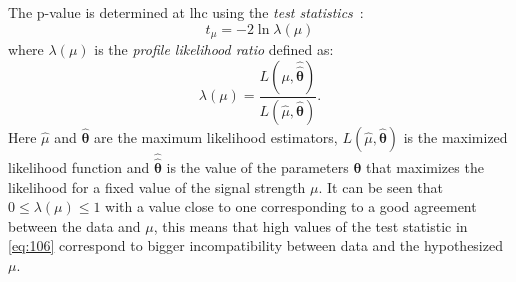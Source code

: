 The p-value is determined at \gls{lhc} using the \emph{test
  statistics}~\cite{StatProcedure}:
\begin{equation}
  \label{eq:106}
  t_\mu = - 2 \ln \lambda(\mu)
\end{equation}
where $\lambda(\mu)$ is the \emph{profile likelihood ratio} defined as:
\begin{equation}
  \label{eq:107}
  \lambda(\mu) = \frac{L(\mu, \hat{\hat{\boldsymbol{\theta}}})}{L(\hat{\mu},
    \hat{\boldsymbol{\theta}})}.
\end{equation}
Here $\hat{\mu}$ and $\hat{\boldsymbol{\theta}}$ are the maximum likelihood
estimators, $L(\hat{\mu}, \hat{\boldsymbol{\theta}})$ is the maximized likelihood
function and $\hat{\hat{\boldsymbol{\theta}}}$ is the value of the parameters
$\boldsymbol{\theta}$ that maximizes the likelihood for a fixed value of the
signal strength $\mu$. It can be seen that $0 \leq \lambda(\mu) \leq 1$ with a
value close to one corresponding to a good agreement between the data and $\mu$,
this means that high values of the test statistic in \cref{eq:106} correspond to
bigger incompatibility between data and the hypothesized $\mu$.

